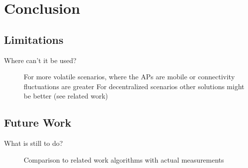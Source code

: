 \chapter{Conclusion}
\section{Limitations}
  \begin{description}
   \item[Where can't it be used?]
    For more volatile scenarios, where the APs are mobile or connectivity fluctuations are greater \newline
    For decentralized scenarios other solutions might be better (see related work) \newline
  \end{description}
\section{Future Work}
  \begin{description}
   \item [What is still to do?]
    Comparison to related work algorithms with actual measurements\newline
    
  \end{description}
